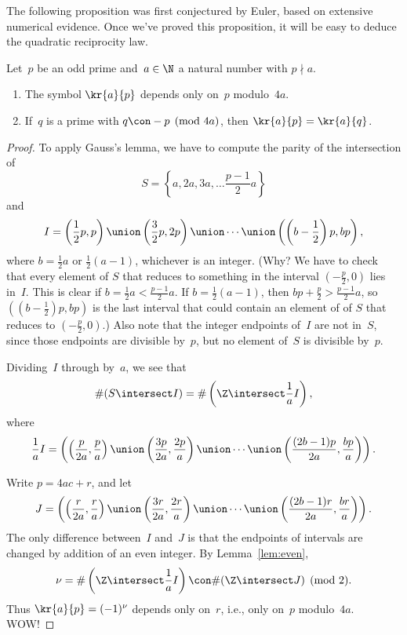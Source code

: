 \documentclass[11pt]{report}
\begin{document}
The following proposition was first conjectured by Euler, based
on extensive numerical evidence.   Once we've proved this proposition,
it will be easy to deduce the quadratic reciprocity law.
\begin{proposition}\label{prop}
  Let~$p$ be an odd prime and~$a\in\N$ a natural number with $p\nmid a$.
  \begin{enumerate}
    \item The symbol $\kr{a}{p}$ depends only on~$p$ modulo~$4a$.
    \item If~$q$ is a prime with $q\con - p \pmod{4a}$,
          then $\kr{a}{p} = \kr{a}{q}$.
  \end{enumerate}
\end{proposition}
\begin{proof}
  To apply Gauss's lemma, we have to compute the parity of the intersection
  of
  $$S = \left\{a, 2a, 3a, \ldots \frac{p-1}{2}a\right\}$$
  and
  $$I = \left(\frac{1}{2}p,p\right) \union \left(\frac{3}{2}p, 2p\right)
    \union \cdots \union
    \left(\left(b-\frac{1}{2}\right)p,bp\right),$$
  where
  $b=\frac{1}{2}a$ or $\frac{1}{2}(a-1)$, whichever is an integer.
    {\small (Why? We have to check that every element of $S$ that reduces
      to something in the interval $(-\frac{p}{2},0)$ lies in~$I$.
      This is clear if $b=\frac{1}{2}a < \frac{p-1}{2}a$.  If
      $b=\frac{1}{2}(a-1)$, then $bp+\frac{p}{2} > \frac{p-1}{2}a$,
      so $((b-\frac{1}{2})p,bp)$ is the last interval that could contain
      an element of of $S$ that reduces to $(-\frac{p}{2},0)$.)
      Also note that the integer endpoints of~$I$ are not in~$S$, since
      those endpoints are divisible by~$p$, but no element of~$S$ is
      divisible by~$p$.}

  Dividing~$I$ through by~$a$, we see that
  $$\#(S\intersect I) = \#\left(\Z \intersect \frac{1}{a}I\right),$$
  where
  $$\frac{1}{a} I =
    \left(\left(\frac{p}{2a},\frac{p}{a}\right)
    \union
    \left(\frac{3p}{2a},\frac{2p}{a}\right)
    \union
    \cdots
    \union
    \left(\frac{(2b-1)p}{2a},\frac{bp}{a}\right)
    \right).$$

  Write $p=4ac+r$, and let
  $$
    J = \left(\left(\frac{r}{2a},\frac{r}{a}\right)
    \union
    \left(\frac{3r}{2a},\frac{2r}{a}\right)
    \union
    \cdots
    \union
    \left(\frac{(2b-1)r}{2a},\frac{br}{a}\right)
    \right).
  $$
  The only difference between~$I$ and~$J$ is that the endpoints of
  intervals are changed by addition of an even integer.
  By Lemma~\ref{lem:even},
  $$\nu=\#\left(\Z \intersect \frac{1}{a}I\right) \con \#(\Z\intersect J)\pmod{2}.$$
  Thus $\kr{a}{p}=(-1)^\nu$ depends only on~$r$,
  i.e., only on~$p$ modulo~$4a$.  {\large\sc WOW!}


\end{proof}
\end{document}
